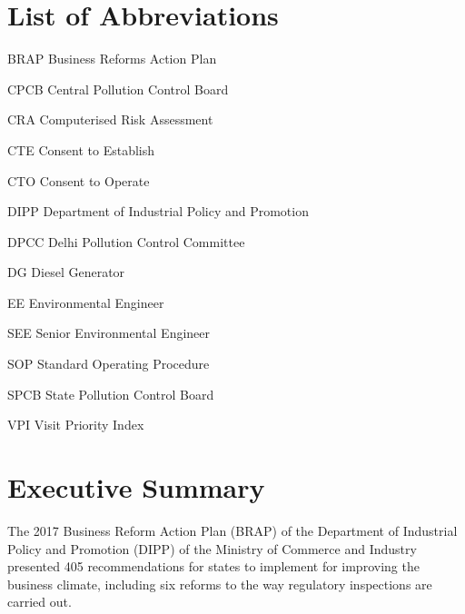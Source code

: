 \documentclass[a4paper, 12pt]{article}
\begin{document}
        \section*{List of Abbreviations}
       
        
        \begin{abbrv}
        \item[BRAP]			Business Reforms Action Plan
        \item[CPCB]			Central Pollution Control Board
        \item[CRA]			Computerised Risk Assessment
        \item[CTE]				Consent to Establish
        \item[CTO]			Consent to Operate
        \item[DIPP]			Department of Industrial Policy and Promotion
        \item[DPCC]			Delhi Pollution Control Committee
        \item[DG]				Diesel Generator
        \item[EE]				Environmental Engineer
        \item[SEE]		                 Senior Environmental Engineer
        \item[SOP]			Standard Operating Procedure
        \item[SPCB]			State Pollution Control Board
        \item[VPI]				Visit Priority Index 
          
        
         
        \end{abbrv}
        
                    
                    \newpage
                    \section*{Executive Summary}
                    The 2017 Business Reform Action Plan (BRAP) of the Department of Industrial Policy and Promotion (DIPP) of the Ministry of Commerce and Industry presented 405 recommendations for states to implement for improving the business climate, including six reforms to the way regulatory inspections are carried out. \\
                  
\end{document}
